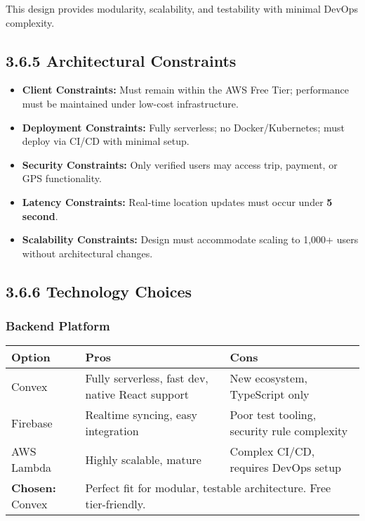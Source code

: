 \documentclass[12pt]{article}
\begin{document}
This design provides modularity, scalability, and testability with minimal DevOps complexity.

\subsection{3.6.5 Architectural Constraints}
\begin{itemize}
  \item \textbf{Client Constraints:} Must remain within the AWS Free Tier; performance must be maintained under low-cost infrastructure.
  \item \textbf{Deployment Constraints:} Fully serverless; no Docker/Kubernetes; must deploy via CI/CD with minimal setup.
  \item \textbf{Security Constraints:} Only verified users may access trip, payment, or GPS functionality.
  \item \textbf{Latency Constraints:} Real-time location updates must occur under \textbf{5 second}.
  \item \textbf{Scalability Constraints:} Design must accommodate scaling to 1,000+ users without architectural changes.
\end{itemize}

\subsection{3.6.6 Technology Choices}

\subsubsection*{Backend Platform}
\begin{tabular}{|l|p{6cm}|p{6cm}|}
\hline
\textbf{Option} & \textbf{Pros} & \textbf{Cons} \\
\hline
Convex & Fully serverless, fast dev, native React support & New ecosystem, TypeScript only \\
\hline
Firebase & Realtime syncing, easy integration & Poor test tooling, security rule complexity \\
\hline
AWS Lambda & Highly scalable, mature & Complex CI/CD, requires DevOps setup \\
\hline
\textbf{Chosen:} Convex & \multicolumn{2}{l|}{Perfect fit for modular, testable architecture. Free tier-friendly.} \\
\hline
\end{tabular}

\vspace{1em}
\end{document}
